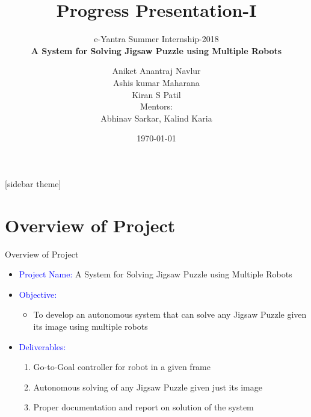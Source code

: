 \documentclass[10pt,a4paper]{beamer}
\begin{document}
	\title{Progress Presentation-I}
	\subtitle{e-Yantra Summer Internship-2018 \\ $ $\textbf{A System for Solving Jigsaw Puzzle using Multiple Robots}$ $}
	\author{$ $Aniket Anantraj Navlur$ $\\$ $Ashis kumar Maharana$ $\\$ $Kiran S Patil$ $\\ \vspace{1em}
	Mentors: \\$ $Abhinav Sarkar, Kalind Karia$ $}
	\date{\today}
	\frame{\titlepage}

[sidebar theme]
\section{Overview of Project}
\begin{frame}{Overview of Project}
	
	\begin{itemize}
		\item \textcolor{blue}{Project Name:} A System for Solving Jigsaw Puzzle using Multiple Robots
		\item \textcolor{blue}{Objective:}
		\begin{itemize}
			\item To develop an autonomous system that can solve any Jigsaw Puzzle given its image using multiple robots 
		\end{itemize}
		\item \textcolor{blue}{Deliverables:}
		\begin{enumerate}
			\item Go-to-Goal controller for robot in a given frame
			\item Autonomous solving of any Jigsaw Puzzle given just its image
			\item Proper documentation and report on solution of the system
		\end{enumerate}
	\end{itemize}
\end{frame}
\end{document}
